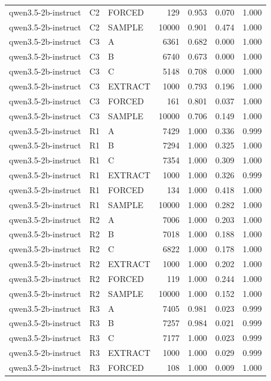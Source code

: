 \begin{table}
\begin{tabular}{lllrrrr}
qwen3.5-2b-instruct & C2 & FORCED & 129 & 0.953 & 0.070 & 1.000 \\
qwen3.5-2b-instruct & C2 & SAMPLE & 10000 & 0.901 & 0.474 & 1.000 \\
qwen3.5-2b-instruct & C3 & A & 6361 & 0.682 & 0.000 & 1.000 \\
qwen3.5-2b-instruct & C3 & B & 6740 & 0.673 & 0.000 & 1.000 \\
qwen3.5-2b-instruct & C3 & C & 5148 & 0.708 & 0.000 & 1.000 \\
qwen3.5-2b-instruct & C3 & EXTRACT & 1000 & 0.793 & 0.196 & 1.000 \\
qwen3.5-2b-instruct & C3 & FORCED & 161 & 0.801 & 0.037 & 1.000 \\
qwen3.5-2b-instruct & C3 & SAMPLE & 10000 & 0.706 & 0.149 & 1.000 \\
qwen3.5-2b-instruct & R1 & A & 7429 & 1.000 & 0.336 & 0.999 \\
qwen3.5-2b-instruct & R1 & B & 7294 & 1.000 & 0.325 & 1.000 \\
qwen3.5-2b-instruct & R1 & C & 7354 & 1.000 & 0.309 & 1.000 \\
qwen3.5-2b-instruct & R1 & EXTRACT & 1000 & 1.000 & 0.326 & 0.999 \\
qwen3.5-2b-instruct & R1 & FORCED & 134 & 1.000 & 0.418 & 1.000 \\
qwen3.5-2b-instruct & R1 & SAMPLE & 10000 & 1.000 & 0.282 & 1.000 \\
qwen3.5-2b-instruct & R2 & A & 7006 & 1.000 & 0.203 & 1.000 \\
qwen3.5-2b-instruct & R2 & B & 7018 & 1.000 & 0.188 & 1.000 \\
qwen3.5-2b-instruct & R2 & C & 6822 & 1.000 & 0.178 & 1.000 \\
qwen3.5-2b-instruct & R2 & EXTRACT & 1000 & 1.000 & 0.202 & 1.000 \\
qwen3.5-2b-instruct & R2 & FORCED & 119 & 1.000 & 0.244 & 1.000 \\
qwen3.5-2b-instruct & R2 & SAMPLE & 10000 & 1.000 & 0.152 & 1.000 \\
qwen3.5-2b-instruct & R3 & A & 7405 & 0.981 & 0.023 & 0.999 \\
qwen3.5-2b-instruct & R3 & B & 7257 & 0.984 & 0.021 & 0.999 \\
qwen3.5-2b-instruct & R3 & C & 7177 & 1.000 & 0.023 & 0.999 \\
qwen3.5-2b-instruct & R3 & EXTRACT & 1000 & 1.000 & 0.029 & 0.999 \\
qwen3.5-2b-instruct & R3 & FORCED & 108 & 1.000 & 0.009 & 1.000 \\

\end{tabular}
\end{table}
